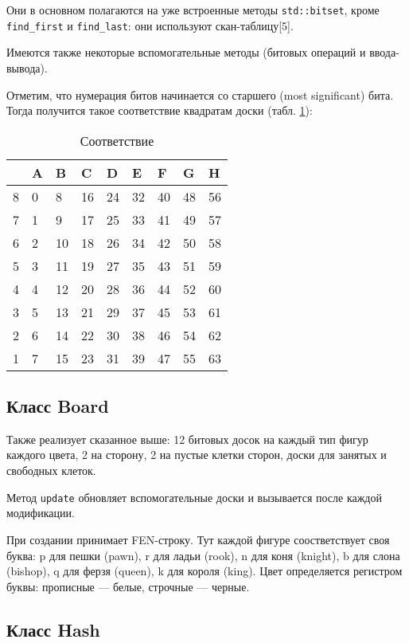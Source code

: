 Они в основном полагаются на уже встроенные методы \texttt{std::bitset}, кроме \texttt{find\_first} и \texttt{find\_last}: они используют скан-таблицу[5].

Имеются также некоторые вспомогательные методы (битовых операций и ввода-вывода).

Отметим, что нумерация битов начинается со старшего (most significant) бита. Тогда получится такое соответствие квадратам доски (табл. \ref{tab: accord}):

\begin{table}[h]
	\centering
	\caption{Соответствие}
	\label{tab: accord}
	\begin{tabular}{|l|l|l|l|l|l|l|l|l|}
		\hline
		& A & B  & C  & D  & E  & F  & G  & H  \\ \hline
		8 & 0 & 8  & 16 & 24 & 32 & 40 & 48 & 56 \\ \hline
		7 & 1 & 9  & 17 & 25 & 33 & 41 & 49 & 57 \\ \hline
		6 & 2 & 10 & 18 & 26 & 34 & 42 & 50 & 58 \\ \hline
		5 & 3 & 11 & 19 & 27 & 35 & 43 & 51 & 59 \\ \hline
		4 & 4 & 12 & 20 & 28 & 36 & 44 & 52 & 60 \\ \hline
		3 & 5 & 13 & 21 & 29 & 37 & 45 & 53 & 61 \\ \hline
		2 & 6 & 14 & 22 & 30 & 38 & 46 & 54 & 62 \\ \hline
		1 & 7 & 15 & 23 & 31 & 39 & 47 & 55 & 63 \\ \hline
	\end{tabular}
\end{table}

\subsection*{Класс Board}

Также реализует сказанное выше: 12 битовых досок на каждый тип фигур каждого цвета, 2 на сторону, 2 на пустые клетки сторон, доски для занятых и свободных клеток. 

Метод \texttt{update} обновляет вспомогательные доски и вызывается после каждой модификации.

При создании принимает FEN-строку. Тут каждой фигуре соостветствует своя буква: p для пешки (pawn), r для ладьи (rook), n для коня (knight), b для слона (bishop), q для ферзя (queen), k для короля (king). Цвет определяется регистром буквы: прописные --- белые, строчные --- черные.

\subsection*{Класс Hash}

